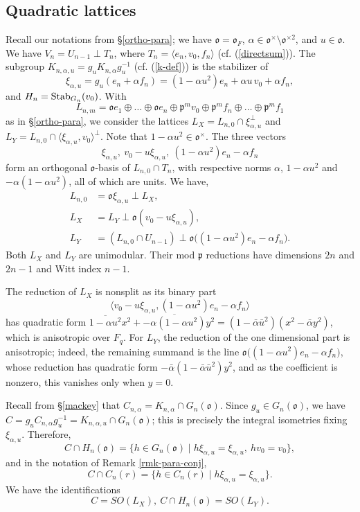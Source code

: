 \documentclass[12pt]{amsart}
\theoremstyle{definition}
\theoremstyle{remark}
\begin{document}
\subsection{Quadratic lattices}\label{section-ql}

Recall our notations from \S \ref{ortho-para}; we have $\mathfrak o=\mathfrak o_F$, $\alpha\in \mathfrak o^\times\setminus \mathfrak o^{\times 2}$, and $u\in\mathfrak o$. We have $V_n=U_{n-1}\perp T_n$, where $T_n=\langle e_n,v_0,f_n\rangle$ (cf. (\ref{directsum})). The subgroup $K_{n,\alpha,u}=g_uK_{n,\alpha}g_u^{-1}$ (cf. (\ref{k-def})) is the stabilizer of 
\[
\xi_{\alpha,u}
=g_u(e_n+\alpha f_n)
=(1-\alpha u^2)e_n+\alpha u\,v_0+\alpha f_n,
\]
and $H_n ={\rm Stab}_{G_n}(v_0)$. With 
\[L_{n,m}= \mathfrak o e_1 \oplus \dots \oplus \mathfrak o e_n \oplus \mathfrak p^m v_0 \oplus \mathfrak p^m f_n \oplus \dots \oplus \mathfrak p^m f_1 \]
as in \S \ref{ortho-para}, we consider the lattices
$
L_X = L_{n,0}\cap\xi_{\alpha,u}^{\perp}$ and $
L_Y = L_{n,0}\cap\langle\xi_{\alpha,u},v_0\rangle^{\perp}.
$
Note that $1-\alpha u^2\in\mathfrak o^\times$. The three vectors
\[
\xi_{\alpha,u},~
v_0-u\xi_{\alpha,u},~
(1-\alpha u^2)e_n-\alpha f_n
\]
form an orthogonal $\mathfrak o$-basis of $L_{n,0}\cap T_n$, with respective norms
$
\alpha$, $1-\alpha u^2$ and $-\alpha(1-\alpha u^2)$, all of which are units. We have,
\begin{align*}
L_{n,0} &=\mathfrak o\xi_{\alpha,u}
\perp L_X, \\
L_X &= L_Y 
\perp\mathfrak o(v_0-u\xi_{\alpha,u}),\\
L_Y &=(L_{n,0}\cap U_{n-1})
\perp
\mathfrak o\bigl((1-\alpha u^2)e_n-\alpha f_n\bigr).
\end{align*}
Both $L_X$ and $L_Y$ are unimodular. Their mod $\mathfrak p$ reductions have dimensions $2n$ and $2n-1$ and Witt index $n-1$. 

The reduction of $L_X$ is nonsplit as its binary part 
\[\langle v_0-u\xi_{\alpha,u}, (1-\alpha u^2)e_n-\alpha f_n \rangle
 \]
has quadratic form $\overline{1-\alpha u^2}x^2+\overline{-\alpha(1-\alpha u^2)}y^2 =
(1-\bar\alpha\bar u^2)(x^2-\bar\alpha y^2)$, 
which is anisotropic over $  F_q$. For $L_Y$, the reduction of the one dimensional part is anisotropic; indeed, the remaining summand is the line
$
\mathfrak o\bigl((1-\alpha u^2)e_n-\alpha f_n\bigr)
$,
whose reduction has quadratic form
$
-\bar\alpha(1-\bar\alpha\bar u^2)y^2
$, and as the coefficient is nonzero, this vanishes only when $y=0$. 

Recall from \S \ref{mackey} that $C_{n,\alpha} = K_{n,\alpha}\cap G_n(\mathfrak o)$.
Since $g_u\in G_n(\mathfrak o)$, we have $C = g_uC_{n,\alpha}g_u^{-1}
=K_{n,\alpha,u}\cap G_n(\mathfrak o)$; this is precisely the integral isometries fixing $\xi_{\alpha,u}$. Therefore,
\[
C \cap H_n(\mathfrak o)
=\{h\in G_n(\mathfrak o) \mid h\xi_{\alpha,u}=\xi_{\alpha,u}, ~ hv_0=v_0\},
\]
and in the notation of Remark \ref{rmk-para-conj},
\[
C \cap C_n(r)
=
\{h\in C_n(r) \mid h\xi_{\alpha,u}=\xi_{\alpha,u}\}.
\]
We have the identifications
\[C = SO(L_X), ~ C \cap H_n(\mathfrak o) = SO(L_Y). \]
\end{document}
